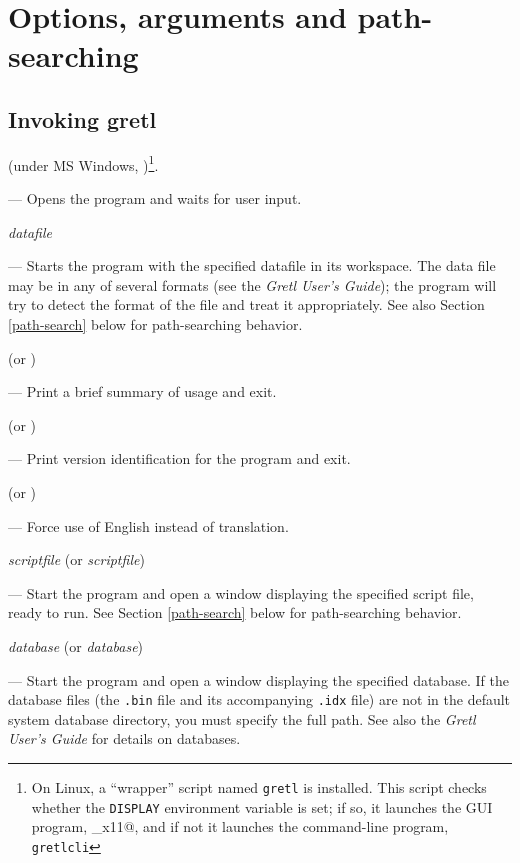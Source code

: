 \chapter{Options, arguments and path-searching}
\label{optarg}

\section{Invoking gretl}
\label{optarg1}

 (under MS Windows, )\footnote{On Linux,
  a ``wrapper'' script named \texttt{gretl} is installed.  This script
  checks whether the \texttt{DISPLAY} environment variable is set; if
  so, it launches the GUI program, \verb@gretl_x11@, and if not it
  launches the command-line program, \texttt{gretlcli}}.

--- Opens the program and waits for user input.
      
 \textsl{datafile}
      
--- Starts the program with the specified datafile in its
workspace. The data file may be in any of several formats (see the
\emph{Gretl User's Guide}); the program will try to detect the format
of the file and treat it appropriately. See also Section
\ref{path-search} below for path-searching behavior.
      
 (or )
      
--- Print a brief summary of usage and exit.
      
 (or )
      
--- Print version identification for the program and exit.
      
 (or )
      
--- Force use of English instead of translation.
      
 \textsl{scriptfile} (or 
\textsl{scriptfile})
      
--- Start the program and open a window displaying the specified
script file, ready to run.  See Section \ref{path-search} below for
path-searching behavior.
      
 \textsl{database} (or 
\textsl{database})

--- Start the program and open a window displaying the specified
database.  If the database files (the \texttt{.bin} file and its
accompanying \texttt{.idx} file) are not in the default system
database directory, you must specify the full path.  See also the
\emph{Gretl User's Guide} for details on databases.
      

